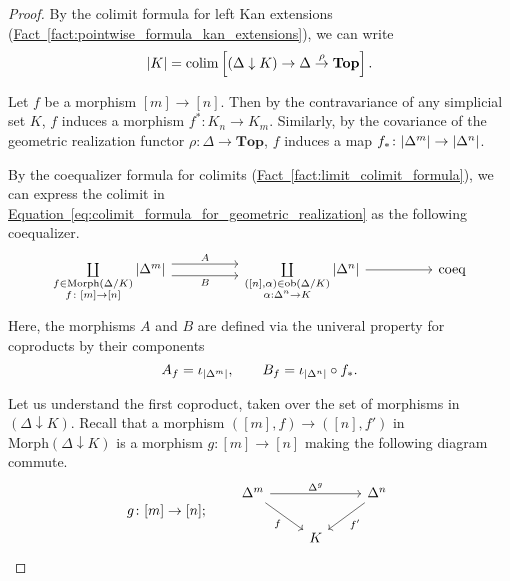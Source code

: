 \documentclass[main.tex]{subfiles}
\begin{document}
\begin{proof}
  By the colimit formula for left Kan extensions (\hyperref[fact:pointwise_formula_kan_extensions]{Fact~\ref*{fact:pointwise_formula_kan_extensions}}), we can write
  \begin{equation}
    \label{eq:colimit_formula_for_geometric_realization}
    {| K |} = \operatorname*{colim}\left[ (\Delta \downarrow K) \to \Delta \overset{\rho}{\to} \mathbf{Top} \right].
  \end{equation}

  Let $f$ be a morphism $[m] \to [n]$. Then by the contravariance of any simplicial set $K$, $f$ induces a morphism $f^{*}\colon K_{n} \to K_{m}$. Similarly, by the covariance of  the geometric realization functor $\rho\colon \Delta \to \mathbf{Top}$, $f$ induces a map $f_{*}\colon {| \Delta^{m} |} \to {| \Delta^{n} |}$.

  By the coequalizer formula for colimits (\hyperref[fact:limit_colimit_formula]{Fact~\ref*{fact:limit_colimit_formula}}), we can express the colimit in \hyperref[eq:colimit_formula_for_geometric_realization]{Equation~\ref*{eq:colimit_formula_for_geometric_realization}} as the following coequalizer.
  \begin{equation*}
    \begin{tikzcd}[row sep=huge, column sep=huge]
      \coprod\limits_{\substack{f \in \mathrm{Morph}(\Delta/K) \\ f\colon [m] \to [n]}} \abs{\Delta^{m}}
      \arrow[r, shift left=1.75, "A"]
      \arrow[r, swap, shift right=1.75, "B"]
      &
      \coprod\limits_{\substack{([n], \alpha) \in \ob(\Delta/K) \\ \alpha: \Delta^{n} \to K}} \abs{\Delta^{n}}
      \arrow[r]
      & \mathrm{coeq}
    \end{tikzcd}
  \end{equation*}
  Here, the morphisms $A$ and $B$ are defined via the univeral property for coproducts by their components
  \begin{equation*}
    A_{f} = \iota_{{| \Delta^{m} |}},\qquad B_{f} = \iota_{{| \Delta^{n} |}} \circ  f_{*}.
  \end{equation*}

  Let us understand the first coproduct, taken over the set of morphisms in $(\Delta \downarrow K)$. Recall that a morphism $([m], f) \to ([n], f')$ in $\mathrm{Morph}(\Delta\downarrow K)$ is a morphism $g\colon [m] \to [n]$ making the following diagram commute.
  \begin{equation*}
    g\colon [m] \to [n];\qquad
    \begin{tikzcd}
      \Delta^{m}
      \arrow[rr, "\Delta^{g}"]
      \arrow[rd, swap, "f"]
      && \Delta^{n}
      \arrow[ld, "f'"]
      \\
      & K
    \end{tikzcd}
  \end{equation*}


\end{proof}
\end{document}
